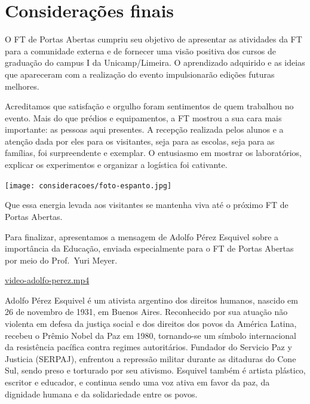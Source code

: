 \documentclass[
  letterpaper,
  DIV=11,
  numbers=noendperiod]{scrreprt}
\begin{document}

\chapter{Considerações finais}\label{considerauxe7uxf5es-finais}

O FT de Portas Abertas cumpriu seu objetivo de apresentar as atividades
da FT para a comunidade externa e de fornecer uma visão positiva dos
cursos de graduação do campus I da Unicamp/Limeira. O aprendizado
adquirido e as ideias que apareceram com a realização do evento
impulsionarão edições futuras melhores.

Acreditamos que satisfação e orgulho foram sentimentos de quem trabalhou
no evento. Mais do que prédios e equipamentos, a FT mostrou a sua cara
mais importante: as pessoas aqui presentes. A recepção realizada pelos
alunos e a atenção dada por eles para os visitantes, seja para as
escolas, seja para as famílias, foi surpreendente e exemplar. O
entusiasmo em mostrar os laboratórios, explicar os experimentos e
organizar a logística foi cativante.

\texttt{[image: consideracoes/foto-espanto.jpg]}

Que essa energia levada aos visitantes se mantenha viva até o próximo FT
de Portas Abertas.

Para finalizar, apresentamos a mensagem de Adolfo Pérez Esquivel sobre a
importância da Educação, enviada especialmente para o FT de Portas
Abertas por meio do Prof.~Yuri Meyer.

\url{video-adolfo-perez.mp4}

\begin{tcolorbox}[enhanced jigsaw, left=2mm, colframe=quarto-callout-caution-color-frame, titlerule=0mm, title=\textcolor{quarto-callout-caution-color}{\faFire}\hspace{0.5em}{Adolfo Pérez Esquivel}, colbacktitle=quarto-callout-caution-color!10!white, opacityback=0, colback=white, bottomrule=.15mm, toptitle=1mm, leftrule=.75mm, bottomtitle=1mm, arc=.35mm, rightrule=.15mm, toprule=.15mm, opacitybacktitle=0.6, breakable, coltitle=black]

Adolfo Pérez Esquivel é um ativista argentino dos direitos humanos,
nascido em 26 de novembro de 1931, em Buenos Aires. Reconhecido por sua
atuação não violenta em defesa da justiça social e dos direitos dos
povos da América Latina, recebeu o Prêmio Nobel da Paz em 1980,
tornando-se um símbolo internacional da resistência pacífica contra
regimes autoritários. Fundador do Servicio Paz y Justicia (SERPAJ),
enfrentou a repressão militar durante as ditaduras do Cone Sul, sendo
preso e torturado por seu ativismo. Esquivel também é artista plástico,
escritor e educador, e continua sendo uma voz ativa em favor da paz, da
dignidade humana e da solidariedade entre os povos.

\end{tcolorbox}
\end{document}
